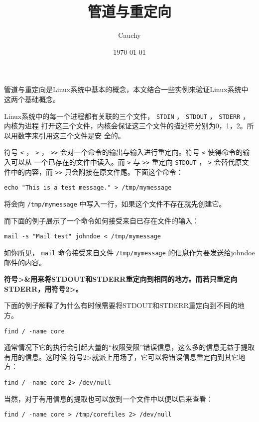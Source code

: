 \documentclass[11pt]{article}
\author{Cauchy}
\date{\today}
\title{管道与重定向}
\begin{document}
\maketitle
\tableofcontents

管道与重定向是Linux系统中基本的概念，本文结合一些实例来验证Linux系统中这两个基础概念。

Linux系统中的每一个进程都有关联的三个文件， \texttt{STDIN} ， \texttt{STDOUT} ， \texttt{STDERR} ， 内核为进程
打开这三个文件，内核会保证这三个文件的描述符分别为0，1，2。所以用数字来引用这三个文件是安
全的。

符号 \texttt{<} ， \texttt{>} ， \texttt{>>} 会对一个命令的输出与输入进行重定向。符号 \texttt{<} 使得命令的输入可以从
一个已存在的文件中读入。而 \texttt{>} 与 \texttt{>>} 重定向 \texttt{STDOUT} ， \texttt{>} 会替代原文件中的内容，而
\texttt{>>} 只会附接在原文件尾。下面这个命令：

\begin{verbatim}
echo "This is a test message." > /tmp/mymessage
\end{verbatim}

将会向 \texttt{/tmp/mymessage} 中写入一行，如果这个文件不存在就先创建它。

而下面的例子展示了一个命令如何接受来自已存在文件的输入：

\begin{verbatim}
mail -s "Mail test" johndoe < /tmp/mymessage
\end{verbatim}

如你所见， \texttt{mail} 命令接受来自文件 \texttt{/tmp/mymessage} 的信息作为要发送给johndoe邮件的内容。

\textbf{符号>\&用来将STDOUT和STDERR重定向到相同的地方。而若只重定向STDERR，用符号2>。}

下面的例子解释了为什么有时候需要将STDOUT和STDERR重定向到不同的地方。

\begin{verbatim}
find / -name core
\end{verbatim}

通常情况下它的执行会引起大量的“权限受限”错误信息，这么多的信息无益于提取有用的信息。这时候
符号2>就派上用场了，它可以将错误信息重定向到其它地方：

\begin{verbatim}
find / -name core 2> /dev/null
\end{verbatim}

当然，对于有用信息的提取也可以放到一个文件中以便以后来查看：

\begin{verbatim}
find / -name core > /tmp/corefiles 2> /dev/null
\end{verbatim}
\end{document}
